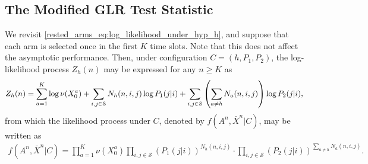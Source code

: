 \subsection{The Modified GLR Test Statistic}
We revisit \eqref{rested_arms_eq:log_likelihood_under_hyp_h}, and suppose that each arm is selected once in the first $K$ time slots. Note that this does not affect the asymptotic performance. Then, under configuration $C=(h,P_1,P_2)$, the log-likelihood process $Z_h(n)$ may be expressed for any $n\geq K$ as
\begingroup\allowdisplaybreaks\begin{align}
	Z_h(n)=\sum\limits_{a=1}^{K}\log\nu(X_0^a)+\sum\limits_{i,j\in\mathcal{S}}N_h(n,i,j)\log P_1(j|i)
	+\sum\limits_{i,j\in\mathcal{S}}\left(\sum\limits_{a\neq h}N_a(n,i,j)\right)\log P_2(j|i),\label{rested_arms_eq:Z_{hh'}(N)_alt_expr}
\end{align}\endgroup
from which the likelihood process under $C$, denoted by $f(A^n,\bar{X}^n|C)$, may be written as
\begingroup\allowdisplaybreaks\begin{align}
	f(A^n,\bar{X}^n|C)=\prod\limits_{a=1}^K \nu(X_0^a)\prod\limits_{i,j\in\mathcal{S}}(P_1(j|i))^{N_h(n,i,j)}
	\cdot \prod\limits_{i,j\in\mathcal{S}}(P_2(j|i))^{\sum\limits_{a\neq h}N_a(n,i,j)}.\label{rested_arms_eq:likelihod_under_hyp_h}
\end{align}\endgroup

